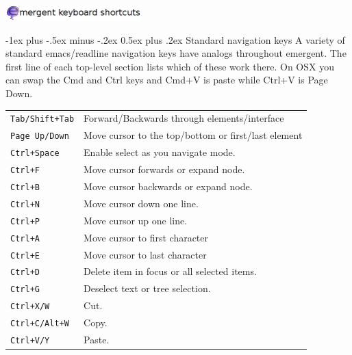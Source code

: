 \documentclass[10pt,landscape]{article}
\makeatletter
\renewcommand{\section}{\@startsection{section}{1}{0mm}%
                                {-1ex plus -.5ex minus -.2ex}%
                                {0.5ex plus .2ex}%
                                {\normalfont\large\bfseries}}
\makeatother
\begin{document}
\raggedright
\footnotesize
\begin{multicols}{3}

\setlength{\premulticols}{1pt}
\setlength{\postmulticols}{1pt}
\setlength{\multicolsep}{1pt}
\setlength{\columnsep}{2pt}

\begin{center}\includegraphics[width=198.5px]{header.png}\end{center}

\section{Standard navigation keys}
A variety of standard emacs/readline navigation keys have analogs
throughout emergent. The first line of each top-level section lists
which of these work there. On OSX you can swap the Cmd and Ctrl keys
and Cmd+V is paste while Ctrl+V is Page Down. \\
\begin{tabular}{@{}ll@{}}
\verb!Tab/Shift+Tab! & Forward/Backwards through elements/interface \\
\verb!Page Up/Down!    & Move cursor to the top/bottom or first/last element\\
\verb!Ctrl+Space!    & Enable select as you navigate mode. \\
\verb!Ctrl+F!    & Move cursor forwards or expand node. \\
\verb!Ctrl+B!    & Move cursor backwards or expand node. \\
\verb!Ctrl+N!    & Move cursor down one line. \\
\verb!Ctrl+P!    & Move cursor up one line. \\
\verb!Ctrl+A!    & Move cursor to first character \\
\verb!Ctrl+E!    & Move cursor to last character \\
\verb!Ctrl+D!  & Delete item in focus or all selected items. \\
\verb!Ctrl+G!  & Deselect text or tree selection. \\
\verb!Ctrl+X/W! & Cut. \\
\verb!Ctrl+C/Alt+W! & Copy. \\
\verb!Ctrl+V/Y! & Paste.
\end{tabular}


\end{multicols}
\end{document}
